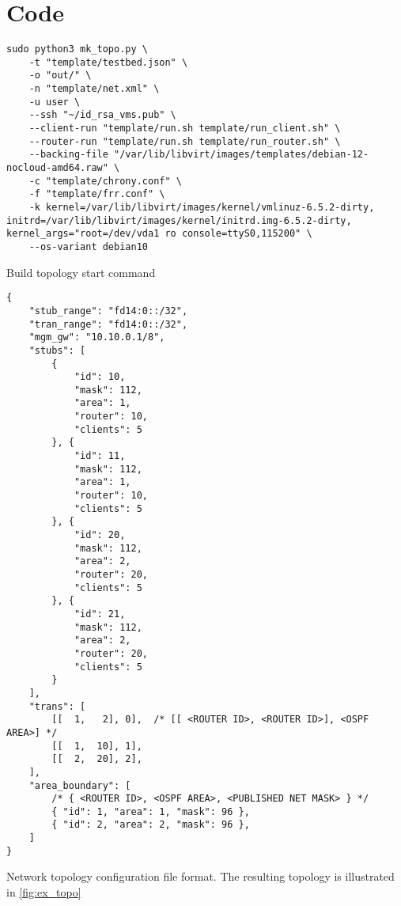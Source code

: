 \chapter{Code} %
\label{chap:Code}

\begin{listing}
\begin{verbatim}
sudo python3 mk_topo.py \
    -t "template/testbed.json" \
    -o "out/" \
    -n "template/net.xml" \
    -u user \
    --ssh "~/id_rsa_vms.pub" \
    --client-run "template/run.sh template/run_client.sh" \
    --router-run "template/run.sh template/run_router.sh" \
    --backing-file "/var/lib/libvirt/images/templates/debian-12-nocloud-amd64.raw" \
    -c "template/chrony.conf" \
    -f "template/frr.conf" \
    -k kernel=/var/lib/libvirt/images/kernel/vmlinuz-6.5.2-dirty, initrd=/var/lib/libvirt/images/kernel/initrd.img-6.5.2-dirty, kernel_args="root=/dev/vda1 ro console=ttyS0,115200" \
    --os-variant debian10
\end{verbatim}
\caption{Build topology start command}
\label{lst:cmd_mk_topo_start}
\end{listing}

\begin{listing}
\begin{verbatim}
{
    "stub_range": "fd14:0::/32",
    "tran_range": "fd14:0::/32",
    "mgm_gw": "10.10.0.1/8",
    "stubs": [
        {
            "id": 10,
            "mask": 112,
            "area": 1,
            "router": 10,
            "clients": 5
        }, {
            "id": 11,
            "mask": 112,
            "area": 1,
            "router": 10,
            "clients": 5
        }, {
            "id": 20,
            "mask": 112,
            "area": 2,
            "router": 20,
            "clients": 5
        }, {
            "id": 21,
            "mask": 112,
            "area": 2,
            "router": 20,
            "clients": 5
        }
    ],
    "trans": [
        [[  1,   2], 0],  /* [[ <ROUTER ID>, <ROUTER ID>], <OSPF AREA>] */
        [[  1,  10], 1],
        [[  2,  20], 2],
    ],
    "area_boundary": [
        /* { <ROUTER ID>, <OSPF AREA>, <PUBLISHED NET MASK> } */
        { "id": 1, "area": 1, "mask": 96 },
        { "id": 2, "area": 2, "mask": 96 },
    ]
}
\end{verbatim}
    \caption[Network topology configuration file format]{
        Network topology configuration file format.
        The resulting topology is illustrated in \autoref{fig:ex_topo}
    }
    \label{lst:topo_cfg_format}
\end{listing}

